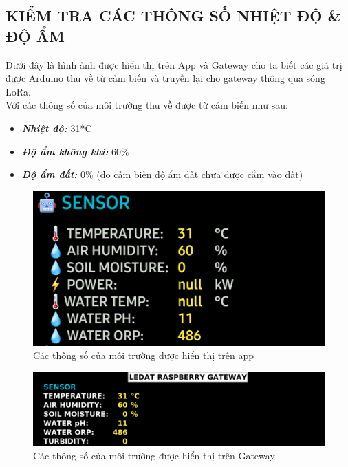 \subsection{KIỂM TRA CÁC THÔNG SỐ NHIỆT ĐỘ \& ĐỘ ẨM}
Dưới đây là hình ảnh được hiển thị trên App và Gateway cho ta biết các giá trị được Arduino thu về từ cảm biến và truyền lại cho gateway thông qua sóng LoRa.\\
\indent Với các thông số của môi trường thu về được từ cảm biến như sau:
\begin{itemize}
	\item \textbf{\textit{Nhiệt độ: }} 31*C
	\item \textbf{\textit{Độ ẩm không khí: }} 60\%
	\item \textbf{\textit{Độ ẩm đất: }} 0\% (do cảm biến độ ẩm đất chưa được cắm vào đất)
\end{itemize}

\begin{figure}[H]
	\centering
	\includegraphics[scale=0.4]{Chapter 4/image chapter 4/appMT.png}
	\caption[Các thông số của môi trường được hiển thị trên app]{Các thông số của môi trường được hiển thị trên app}
	\label{hinh43}
\end{figure}
\begin{figure}[H]
	\centering
	\includegraphics[scale=0.4]{Chapter 4/image chapter 4/gwMT.png}
	\caption[Các thông số của môi trường được hiển thị trên Gateway]{Các thông số của môi trường được hiển thị trên Gateway}
	\label{hinh44}
\end{figure}
